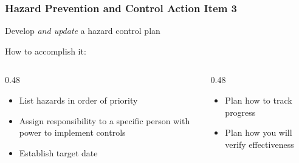 \begin{frame}
	\frametitle{Hazard Prevention and Control Action Item 3}

    Develop \emph{and update} a hazard control plan

    \begin{block}{How to accomplish it:}
        \vspace{-1.5em}
        \begin{columns}[t]
            \begin{column}{0.48\linewidth}
                \begin{itemize}[<+- | alert@+>]
                    \item List hazards in order of priority
                    \item Assign responsibility to a specific person with power to implement controls
                    \item Establish target date
                \end{itemize}
            \end{column}
            \begin{column}{0.48\linewidth}
                \begin{itemize}[<+- | alert@+>]
                    \item Plan how to track progress
                    \item Plan how you will verify effectiveness
                \end{itemize}
            \end{column}
        \end{columns}
    \end{block}
\end{frame}

